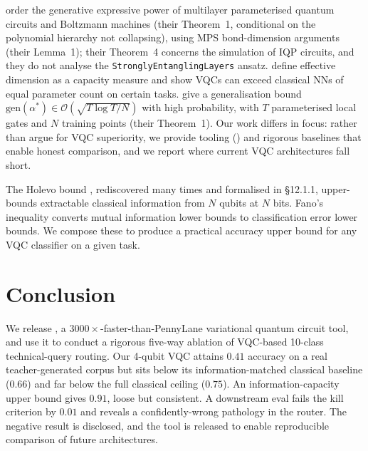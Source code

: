 \citet{du2020expressive} order the generative expressive power of multilayer parameterised quantum circuits and Boltzmann machines (their Theorem~1, conditional on the polynomial hierarchy not collapsing), using MPS bond-dimension arguments (their Lemma~1); their Theorem~4 concerns the simulation of IQP circuits, and they do not analyse the \texttt{StronglyEntanglingLayers} ansatz. \citet{abbas2021effective} define effective dimension as a capacity measure and show VQCs can exceed classical NNs of equal parameter count on certain tasks. %
\citet{caro2022generalization} give a generalisation bound $\mathrm{gen}(\alpha^*) \in \mathcal{O}(\sqrt{T \log T / N})$ with high probability, with $T$ parameterised local gates and $N$ training points (their Theorem~1). Our work differs in focus: rather than argue for VQC superiority, we provide tooling (\torchvqc) and rigorous baselines that enable honest comparison, and we report where current VQC architectures fall short.

The Holevo bound \citep{holevo1973bounds}, rediscovered many times and formalised in \citet{nielsen2010quantum} \S12.1.1, upper-bounds extractable classical information from $N$ qubits at $N$ bits. Fano's inequality \citep{fano1961transmission} converts mutual information lower bounds to classification error lower bounds. We compose these to produce a practical accuracy upper bound for any VQC classifier on a given task.

\section{Conclusion}

We release \torchvqc{}, a $3000\times$-faster-than-PennyLane variational quantum circuit tool, and use it to conduct a rigorous five-way ablation of VQC-based 10-class technical-query routing. Our 4-qubit VQC attains $0.41$ accuracy on a real teacher-generated corpus but sits below its information-matched classical baseline ($0.66$) and far below the full classical ceiling ($0.75$). An information-capacity upper bound gives $0.91$, loose but consistent. A downstream eval fails the kill criterion by $0.01$ and reveals a confidently-wrong pathology in the \vqc{} router. The negative result is disclosed, and the tool is released to enable reproducible comparison of future architectures.




